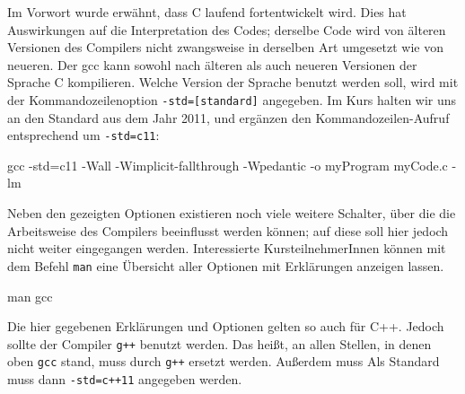 Im Vorwort wurde erwähnt, dass C laufend fortentwickelt wird. Dies hat Auswirkungen auf die Interpretation des Codes; derselbe Code wird von älteren Versionen des Compilers nicht zwangsweise in derselben Art umgesetzt wie von neueren. Der gcc kann sowohl nach älteren als auch neueren Versionen der Sprache C kompilieren. Welche Version der Sprache benutzt werden soll, wird mit der Kommandozeilenoption \texttt{-std=[standard]} angegeben. Im Kurs halten wir uns an den Standard aus dem Jahr 2011, und ergänzen den Kommandozeilen-Aufruf entsprechend um \texttt{-std=c11}:
\begin{cmdbox}
gcc -std=c11 -Wall -Wimplicit-fallthrough -Wpedantic -o myProgram myCode.c -lm
\end{cmdbox}

Neben den gezeigten Optionen existieren noch viele weitere Schalter, über die die Arbeitsweise des Compilers beeinflusst werden können; auf diese soll hier jedoch nicht weiter eingegangen werden. Interessierte KursteilnehmerInnen können mit dem Befehl \texttt{man} eine Übersicht aller Optionen mit Erklärungen anzeigen lassen.
\begin{cmdbox}
man gcc
\end{cmdbox}

\begin{plusbox}
Die hier gegebenen Erklärungen und Optionen gelten so auch für C++. Jedoch sollte der Compiler \texttt{g++} benutzt werden. Das heißt, an allen Stellen, in denen oben \texttt{gcc} stand, muss durch \texttt{g++} ersetzt werden. Außerdem muss Als Standard muss dann \texttt{-std=c++11} angegeben werden.
\end{plusbox}

